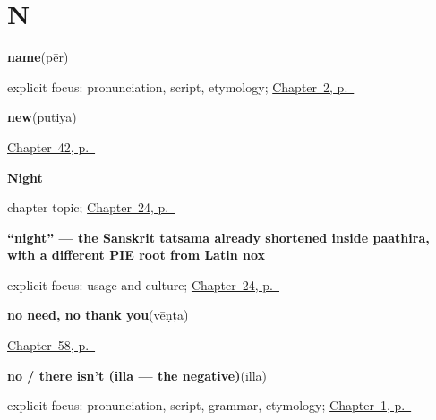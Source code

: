 \section*{N}

\noindent\begin{minipage}[t]{\linewidth}
\raggedright
\textbf{name}\enspace\emph{}\enspace(pēr)\par
\footnotesize explicit focus: pronunciation, script, etymology; \hyperref[ch:introductions]{Chapter~2, p.~\pageref*{ch:introductions}}
\end{minipage}\par\smallskip

\noindent\begin{minipage}[t]{\linewidth}
\raggedright
\textbf{new}\enspace\emph{}\enspace(putiya)\par
\footnotesize \hyperref[ch:ml-describing-things]{Chapter~42, p.~\pageref*{ch:ml-describing-things}}
\end{minipage}\par\smallskip

\noindent\begin{minipage}[t]{\linewidth}
\raggedright
\textbf{Night}\par
\footnotesize chapter topic; \hyperref[ch:ml-night]{Chapter~24, p.~\pageref*{ch:ml-night}}
\end{minipage}\par\smallskip

\noindent\begin{minipage}[t]{\linewidth}
\raggedright
\textbf{\textquotedblleft{}night\textquotedblright{} — the Sanskrit tatsama already shortened inside paathira, with a different PIE root from Latin nox}\enspace\emph{}\par
\footnotesize explicit focus: usage and culture; \hyperref[ch:ml-night]{Chapter~24, p.~\pageref*{ch:ml-night}}
\end{minipage}\par\smallskip

\noindent\begin{minipage}[t]{\linewidth}
\raggedright
\textbf{no need, no thank you}\enspace\emph{}\enspace(vēṇṭa)\par
\footnotesize \hyperref[ch:ml-five-more-short-answers]{Chapter~58, p.~\pageref*{ch:ml-five-more-short-answers}}
\end{minipage}\par\smallskip

\noindent\begin{minipage}[t]{\linewidth}
\raggedright
\textbf{no / there isn't (illa — the negative)}\enspace\emph{}\enspace(illa)\par
\footnotesize explicit focus: pronunciation, script, grammar, etymology; \hyperref[ch:greetings]{Chapter~1, p.~\pageref*{ch:greetings}}
\end{minipage}\par\smallskip

